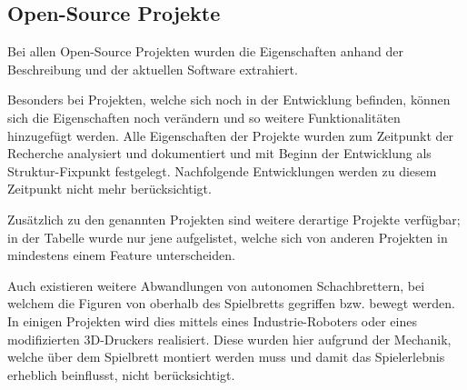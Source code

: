 \hypertarget{open-source-projekte}{%
\subsection{Open-Source Projekte}\label{open-source-projekte}}

Bei allen Open-Source Projekten wurden die Eigenschaften anhand der
Beschreibung und der aktuellen Software extrahiert.

Besonders bei Projekten, welche sich noch in der Entwicklung befinden,
können sich die Eigenschaften noch verändern und so weitere
Funktionalitäten hinzugefügt werden. Alle Eigenschaften der Projekte
wurden zum Zeitpunkt der Recherche analysiert und dokumentiert und mit
Beginn der Entwicklung als Struktur-Fixpunkt festgelegt. Nachfolgende
Entwicklungen werden zu diesem Zeitpunkt nicht mehr berücksichtigt.

Zusätzlich zu den genannten Projekten sind weitere derartige Projekte
verfügbar; in der Tabelle wurde nur jene aufgelistet, welche sich von
anderen Projekten in mindestens einem Feature unterscheiden.

Auch existieren weitere Abwandlungen von autonomen Schachbrettern, bei
welchem die Figuren von oberhalb des Spielbretts gegriffen bzw. bewegt
werden. In einigen Projekten wird dies mittels eines Industrie-Roboters
\cite{actprojectrobot} oder eines modifizierten
3D-Druckers\cite{atcproject3dprinter} realisiert. Diese wurden hier
aufgrund der Mechanik, welche über dem Spielbrett montiert werden muss
und damit das Spielerlebnis erheblich beinflusst, nicht berücksichtigt.

